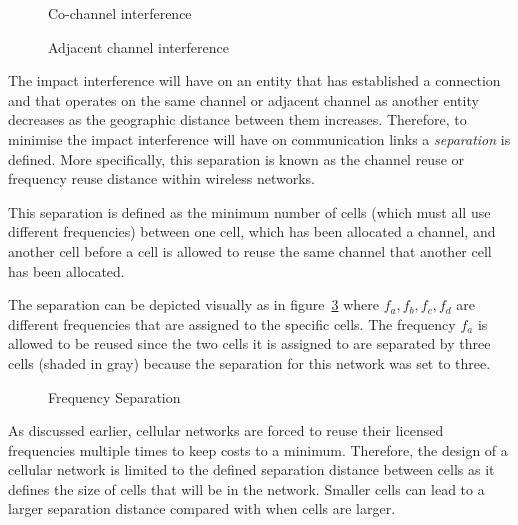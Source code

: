 \begin{figure}[H]
	\begin{centering}
	
	\caption{Co-channel interference}
	\label{fig:sameinterference}
	\end{centering}
\end{figure}
\begin{figure}[H]
	\begin{centering}
	
	\caption{Adjacent channel interference}
	\label{fig:adjacentinterference}
	\end{centering}
\end{figure}

The impact interference will have on an entity that has established a connection and that operates on the same channel or adjacent channel as another entity decreases as the geographic distance between them increases\cite{InterferenceOrientatedFAP}. Therefore, to minimise the impact interference will have on communication links a \emph{separation} is defined\cite{WirelessCommunications}. More specifically, this separation is known as the channel reuse or frequency reuse distance within wireless networks\cite{WirelessCommunications}.

This separation is defined as the minimum number of cells (which must all use different frequencies) between one cell, which has been allocated a channel, and another cell before a cell is allowed to reuse the same channel that another cell has been allocated\cite{WirelessCommunications,InterferenceOrientatedFAP}. 

The separation can be depicted visually as in figure~\ref{fig:seperationgraph} where $f_a,f_b,f_c,f_d$ are different frequencies that are assigned to the specific cells. The frequency $f_a$ is allowed to be reused since the two cells it is assigned to are separated by three cells (shaded in gray) because the separation for this network was set to three.

\begin{figure}[H]
	\begin{centering}
	
	\caption{Frequency Separation}
	\label{fig:seperationgraph}
	\end{centering}
\end{figure}


As discussed earlier, cellular networks are forced to reuse their licensed frequencies multiple times to keep costs to a minimum. Therefore, the design of a cellular network is limited to the defined separation distance between cells as it defines the size of cells that will be in the network\cite{Eisenblatter,InterferenceOrientatedFAP}. Smaller cells can lead to a larger separation distance compared with when cells are larger\cite{WirelessCommunications,WirelessDigitalCommunications}.

